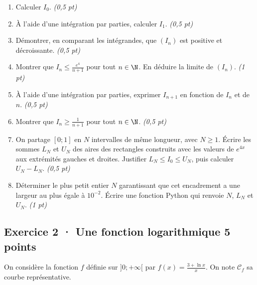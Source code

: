 \begin{enumerate}

\item Calculer $I_0$. \hfill\textit{(0{,}5 pt)}

\item À l'aide d'une intégration par parties, calculer $I_1$. \hfill\textit{(0{,}5 pt)}

\item Démontrer, en comparant les intégrandes, que $(I_n)$ est positive et décroissante. \hfill\textit{(0{,}5 pt)}

\item Montrer que $I_n\le\frac{e^{4}}{n+1}$ pour tout $n\in\N$. En déduire la limite de $(I_n)$. \hfill\textit{(1 pt)}

\item À l'aide d'une intégration par parties, exprimer $I_{n+1}$ en fonction de $I_n$ et de $n$. \hfill\textit{(0{,}5 pt)}

\item Montrer que $I_n\ge\frac1{n+1}$ pour tout $n\in\N$. \hfill\textit{(0{,}5 pt)}

\item On partage $[0;1]$ en $N$ intervalles de même longueur, avec $N\ge1$. Écrire les sommes $L_N$ et $U_N$ des aires des rectangles construits avec les valeurs de $e^{4x}$ aux extrémités gauches et droites. Justifier $L_N\le I_0\le U_N$, puis calculer $U_N-L_N$. \hfill\textit{(0{,}5 pt)}

\item Déterminer le plus petit entier $N$ garantissant que cet encadrement a une largeur au plus égale à $10^{-2}$. Écrire une fonction Python qui renvoie $N$, $L_N$ et $U_N$. \hfill\textit{(1 pt)}

\end{enumerate}

\subsection*{Exercice 2 · Une fonction logarithmique \hfill 5 points}On considère la fonction $f$ définie sur $]0;+\infty[$ par $f(x)=\frac{3+\ln x}x$. On note $\mathcal C_f$ sa courbe représentative.

